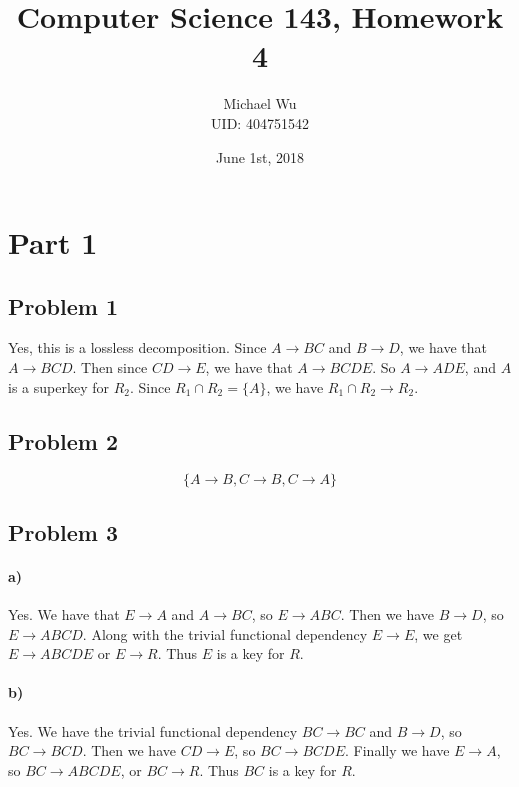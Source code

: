 \documentclass[12pt]{article}
\begin{document}
\title{Computer Science 143, Homework 4}
\date{June 1st, 2018}
\author{Michael Wu\\UID: 404751542}
\maketitle

\section*{Part 1}

\subsection*{Problem 1}

Yes, this is a lossless decomposition. Since \(A\rightarrow BC\) and \(B\rightarrow D\), we have that \(A\rightarrow BCD\). Then
since \(CD\rightarrow E\), we have that \(A\rightarrow BCDE\). So \(A\rightarrow ADE\), and \(A\) is a superkey for \(R_2\). Since
\(R_1 \cap R_2 = \{A\}\), we have \(R_1 \cap R_2 \rightarrow R_2\).

\subsection*{Problem 2}

\[\{A\rightarrow B, C\rightarrow B, C\rightarrow A\}\]

\subsection*{Problem 3}

\paragraph{a)}

Yes. We have that \(E\rightarrow A\) and \(A\rightarrow BC\), so \(E\rightarrow ABC\). Then we have \(B\rightarrow D\), so \(E\rightarrow ABCD\).
Along with the trivial functional dependency \(E\rightarrow E\), we get \(E\rightarrow ABCDE\) or \(E\rightarrow R\). Thus \(E\) is a key for \(R\).

\paragraph{b)}

Yes. We have the trivial functional dependency \(BC\rightarrow BC\) and \(B\rightarrow D\), so \(BC\rightarrow BCD\). Then we have \(CD\rightarrow E\),
so \(BC\rightarrow BCDE\). Finally we have \(E\rightarrow A\), so \(BC\rightarrow ABCDE\), or \(BC\rightarrow R\). Thus \(BC\) is a key for \(R\).
\end{document}
